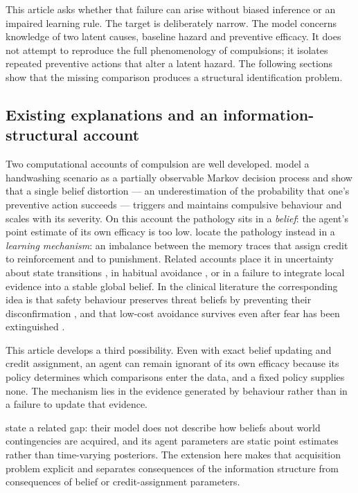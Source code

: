 \documentclass[11pt]{article}
\begin{document}
This article asks whether that failure can arise without biased inference or an
impaired learning rule. The target is deliberately narrow. The model concerns
knowledge of two latent causes, baseline hazard and preventive efficacy. It does
not attempt to reproduce the full phenomenology of compulsions; it isolates
repeated preventive actions that alter a latent hazard. The following sections
show that the missing comparison produces a structural identification problem.

\subsection{Existing explanations and an information-structural account}

Two computational accounts of compulsion are well developed.
\citet{rigoux2024beliefs} model a handwashing scenario as a partially observable
Markov decision process and show that a single belief distortion --- an
underestimation of the probability that one's preventive action succeeds ---
triggers and maintains compulsive behaviour and scales with its severity. On this
account the pathology sits in a \emph{belief}: the agent's point estimate of its
own efficacy is too low. \citet{sakai2022eligibility} locate the pathology
instead in a \emph{learning mechanism}: an imbalance between the memory traces
that assign credit to reinforcement and to punishment. Related accounts place it
in uncertainty about state transitions
\citep{fradkin2020searching,fradkin2020latent,prudon2021,sharp2023transition}, in
habitual avoidance \citep{gillan2014enhanced}, or in a failure to integrate
local evidence into a stable global belief. In the
clinical literature the corresponding idea is that safety behaviour preserves
threat beliefs by preventing their disconfirmation
\citep{lovibond2009safety,craske2014inhibitory}, and that low-cost avoidance
survives even after fear has been extinguished \citep{vervliet2015low}.

This article develops a third possibility. Even with exact belief updating and
credit assignment, an agent can remain ignorant of its own efficacy because its
policy determines which comparisons enter the data, and a fixed policy supplies
none. The mechanism lies in the evidence generated by behaviour rather than in a
failure to update that evidence.

\citet{rigoux2024beliefs} state a related gap: their model does not describe how
beliefs about world contingencies are acquired, and its agent parameters are
static point estimates rather than time-varying posteriors. The extension here
makes that acquisition problem explicit and separates consequences of the
information structure from consequences of belief or credit-assignment parameters.
\end{document}
